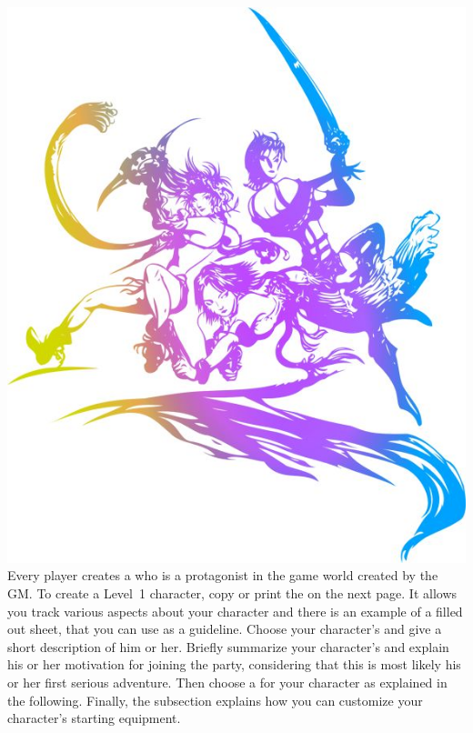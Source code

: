 %
\\
%
\includegraphics[width=\columnwidth]{./art/images/ff10-2.jpg}
%
\vfill
%
Every player creates a  who is a protagonist in the game world created by the GM.
To create a Level~1 character, copy or print the  on the next page.
It allows you track various aspects about your character and there is an example of a filled out sheet, that you can use as a guideline.
Choose your character's  and give a short description of him or her.
Briefly summarize your character's  and explain his or her motivation for joining the party, considering that this is most likely his or her first serious adventure.
Then choose a  for your character as explained in the following. 
Finally, the  subsection explains how you can customize your character's starting equipment.
